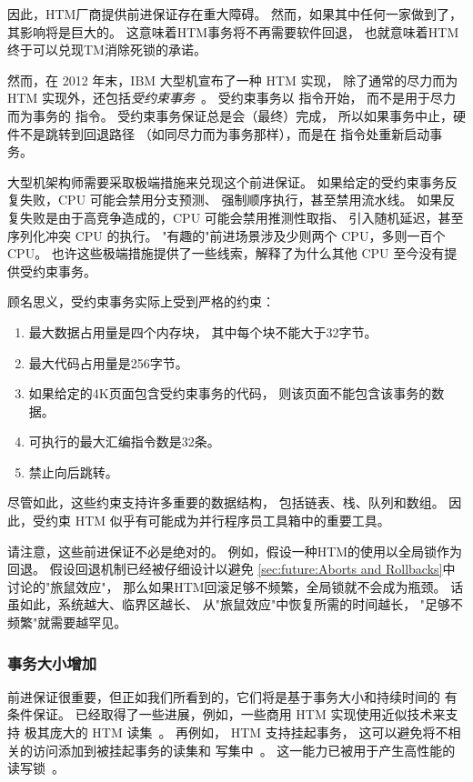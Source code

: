 因此，HTM厂商提供前进保证存在重大障碍。
然而，如果其中任何一家做到了，其影响将是巨大的。
这意味着HTM事务将不再需要软件回退，
也就意味着HTM终于可以兑现TM消除死锁的承诺。

然而，在 2012 年末，IBM 大型机宣布了一种 HTM 实现，
除了通常的尽力而为 HTM 实现外，还包括\emph{受约束事务}~\cite{ChristianJacobi2012MainframeTM}。
受约束事务以  指令开始，
而不是用于尽力而为事务的  指令。
受约束事务保证总是会（最终）完成，
所以如果事务中止，硬件不是跳转到回退路径
（如同尽力而为事务那样），而是在  指令处重新启动事务。

大型机架构师需要采取极端措施来兑现这个前进保证。
如果给定的受约束事务反复失败，CPU 可能会禁用分支预测、
强制顺序执行，甚至禁用流水线。
如果反复失败是由于高竞争造成的，CPU 可能会禁用推测性取指、
引入随机延迟，甚至序列化冲突 CPU 的执行。
"有趣的"前进场景涉及少则两个 CPU，多则一百个 CPU。
也许这些极端措施提供了一些线索，解释了为什么其他 CPU
至今没有提供受约束事务。

顾名思义，受约束事务实际上受到严格的约束：

\begin{enumerate}
\item	最大数据占用量是四个内存块，
	其中每个块不能大于32字节。
\item	最大代码占用量是256字节。
\item	如果给定的4K页面包含受约束事务的代码，
	则该页面不能包含该事务的数据。
\item	可执行的最大汇编指令数是32条。
\item	禁止向后跳转。
\end{enumerate}

尽管如此，这些约束支持许多重要的数据结构，
包括链表、栈、队列和数组。
因此，受约束 HTM 似乎有可能成为并行程序员工具箱中的重要工具。

请注意，这些前进保证不必是绝对的。
例如，假设一种HTM的使用以全局锁作为回退。
假设回退机制已经被仔细设计以避免
\cref{sec:future:Aborts and Rollbacks}中讨论的"旅鼠效应"，
那么如果HTM回滚足够不频繁，全局锁就不会成为瓶颈。
话虽如此，系统越大、临界区越长、
从"旅鼠效应"中恢复所需的时间越长，
"足够不频繁"就需要越罕见。

\subsubsection{事务大小增加}
\label{sec:future:Transaction-Size Increases}

前进保证很重要，但正如我们所看到的，它们将是基于事务大小和持续时间的
有条件保证。
已经取得了一些进展，例如，一些商用 HTM 实现使用近似技术来支持
极其庞大的 HTM 读集~\cite{RaviRajwar2012TSX}。
再例如， HTM 支持挂起事务，
这可以避免将不相关的访问添加到被挂起事务的读集和
写集中~\cite{Le:2015:TMS:3266491.3266500}。
这一能力已被用于产生高性能的
读写锁~\cite{PascalFelber2016rwlockElision}。


